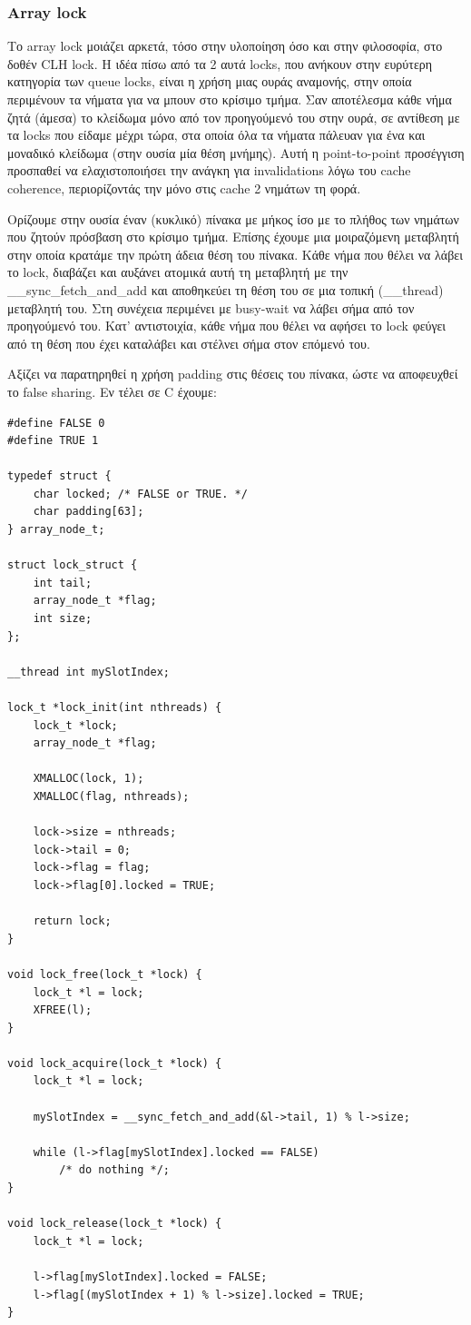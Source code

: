 \documentclass[12pt,titlepage]{article}
\begin{document}
\subsubsection{Array lock}

Το array lock μοιάζει αρκετά, τόσο στην υλοποίηση όσο και στην φιλοσοφία, στο
δοθέν CLH lock. Η ιδέα πίσω από τα 2 αυτά locks, που ανήκουν στην ευρύτερη
κατηγορία των queue locks, είναι η χρήση μιας ουράς αναμονής, στην οποία
περιμένουν τα νήματα για να μπουν στο κρίσιμο τμήμα. Σαν αποτέλεσμα κάθε νήμα
ζητά (άμεσα) το κλείδωμα μόνο από τον προηγούμενό του στην ουρά, σε αντίθεση με
τα locks που είδαμε μέχρι τώρα, στα οποία όλα τα νήματα πάλευαν για ένα και
μοναδικό κλείδωμα (στην ουσία μία θέση μνήμης). Αυτή η point-to-point
προσέγγιση προσπαθεί να ελαχιστοποιήσει την ανάγκη για invalidations λόγω του
cache coherence, περιορίζοντάς την μόνο στις cache 2 νημάτων τη φορά.

Ορίζουμε στην ουσία έναν (κυκλικό) πίνακα με μήκος ίσο με το πλήθος των νημάτων
που ζητούν πρόσβαση στο κρίσιμο τμήμα. Επίσης έχουμε μια μοιραζόμενη μεταβλητή
στην οποία κρατάμε την πρώτη άδεια θέση του πίνακα. Κάθε νήμα που θέλει να λάβει
το lock, διαβάζει και αυξάνει ατομικά αυτή τη μεταβλητή με την
\_\_sync\_fetch\_and\_add και αποθηκεύει τη θέση του σε μια τοπική (\_\_thread)
μεταβλητή του. Στη συνέχεια περιμένει με busy-wait να λάβει σήμα από τον
προηγούμενό του. Κατ' αντιστοιχία, κάθε νήμα που θέλει να αφήσει το lock
φεύγει από τη θέση που έχει καταλάβει και στέλνει σήμα στον επόμενό του.

Αξίζει να παρατηρηθεί η χρήση padding στις θέσεις του πίνακα, ώστε να αποφευχθεί
το false sharing. Εν τέλει σε C έχουμε:

\begin{verbatim}
#define FALSE 0
#define TRUE 1

typedef struct {
    char locked; /* FALSE or TRUE. */
    char padding[63];
} array_node_t;

struct lock_struct {
    int tail;
    array_node_t *flag;
    int size;
};

__thread int mySlotIndex;

lock_t *lock_init(int nthreads) {
    lock_t *lock;
    array_node_t *flag;

    XMALLOC(lock, 1);
    XMALLOC(flag, nthreads);

    lock->size = nthreads;
    lock->tail = 0;
    lock->flag = flag;
    lock->flag[0].locked = TRUE;

    return lock;
}

void lock_free(lock_t *lock) {
    lock_t *l = lock;
    XFREE(l);
}

void lock_acquire(lock_t *lock) {
    lock_t *l = lock;

    mySlotIndex = __sync_fetch_and_add(&l->tail, 1) % l->size;

    while (l->flag[mySlotIndex].locked == FALSE)
        /* do nothing */;
}

void lock_release(lock_t *lock) {
    lock_t *l = lock;

    l->flag[mySlotIndex].locked = FALSE;
    l->flag[(mySlotIndex + 1) % l->size].locked = TRUE;
}
\end{verbatim}
\end{document}
